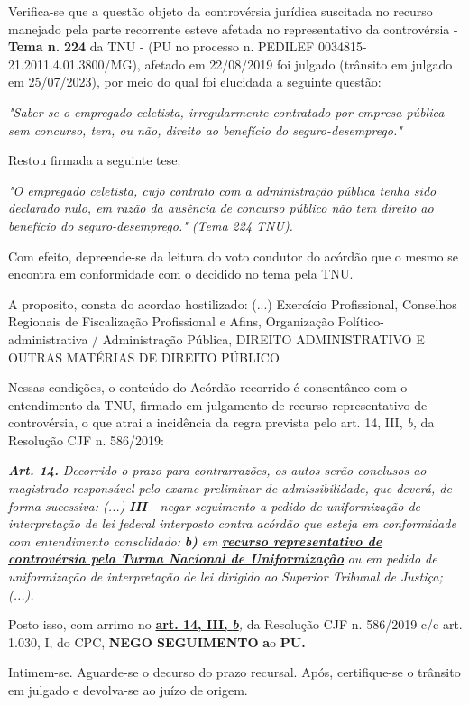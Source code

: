 \documentclass[12pt]{article}
\begin{document}
\justifying
\noindent Verifica-se que a questão objeto da controvérsia jurídica suscitada no recurso manejado pela parte recorrente esteve afetada no representativo da controvérsia - \textbf{Tema n. }\textbf{224} da TNU - (PU no processo n. PEDILEF 0034815-21.2011.4.01.3800/MG),  afetado em 22/08/2019 foi julgado (trânsito em julgado em 25/07/2023), por meio do qual foi elucidada a seguinte questão:

\noindent \textit{"Saber se o empregado celetista, irregularmente contratado por empresa pública sem concurso, tem, ou não, direito ao benefício do seguro-desemprego."}

\noindent Restou firmada a seguinte tese:

\noindent \textit{"O empregado celetista, cujo contrato com a administração pública tenha sido declarado nulo, em razão da ausência de concurso público não tem direito ao benefício do seguro-desemprego." (Tema 224 TNU).}

\noindent Com efeito, depreende-se da leitura do voto condutor do acórdão que o mesmo se encontra em conformidade com o decidido no  tema pela TNU.

\noindent A proposito, consta do acordao hostilizado: (...) Exercício Profissional, Conselhos Regionais de Fiscalização Profissional e Afins, Organização Político-administrativa / Administração Pública, DIREITO ADMINISTRATIVO E OUTRAS MATÉRIAS DE DIREITO PÚBLICO

\noindent Nessas condições, o conteúdo do Acórdão recorrido é consentâneo com o entendimento da TNU, firmado em julgamento de recurso representativo de controvérsia, o que atrai a incidência da regra prevista pelo art. 14, III, \textit{b,} da Resolução CJF n. 586/2019:

\noindent \textit{\textbf{Art. 14.}}\textit{ Decorrido o prazo para contrarrazões, os autos serão conclusos ao magistrado responsável pelo exame preliminar de admissibilidade, que deverá, de forma sucessiva: (...) }\textit{\textbf{III }}\textit{- negar seguimento a pedido de uniformização de interpretação de lei federal interposto contra acórdão que esteja em conformidade com entendimento consolidado: }\textit{\textbf{b)}}\textit{ em }\uline{\textit{\textbf{recurso representativo de controvérsia pela Turma Nacional de Uniformização}}}\textit{ ou em pedido de uniformização de interpretação de lei dirigido ao Superior Tribunal de Justiça;(...).}

\noindent Posto isso, com arrimo no \uline{\textbf{art. 14, III, }}\uline{\textit{\textbf{b}}}\textit{,} da Resolução CJF n. 586/2019 c/c art. 1.030, I, do CPC, \textbf{NEGO SEGUIMENTO }\textbf{a}o\textbf{ PU}\textbf{.}

\noindent Intimem-se. Aguarde-se o decurso do prazo recursal. Após, certifique-se o trânsito em julgado e devolva-se ao juízo de origem.
\end{document}
